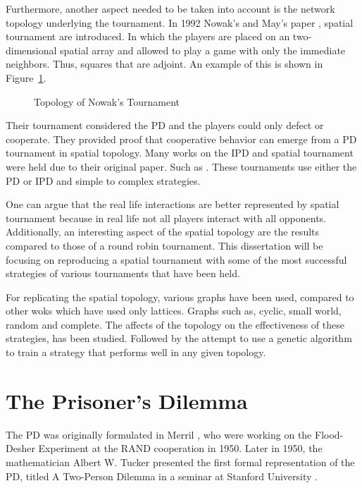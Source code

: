 Furthermore, another aspect needed to be taken into account is the network
topology underlying the tournament. In 1992 Nowak's and May's paper \cite{Nowak1992},
spatial tournament are introduced. In which the players are placed on an two-
dimensional spatial array and allowed to play a game with only the immediate neighbors.
Thus, squares that are adjoint. An example of this is shown in Figure~\ref{fig:nowak-example}.

\begin{figure}[!hbtp]
	\centering
		
		\caption{Topology of Nowak's Tournament}
  \label{fig:nowak-example}
\end{figure}

Their tournament considered the PD and the players could only defect or
cooperate.  They provided proof that cooperative behavior can emerge from a PD
tournament in spatial topology. Many works on the IPD and spatial tournament
were held due to their original paper. Such as \cite{Grujic2014, Nowak1993,
Maciver1992, Nowak1992, Brauchli1999, Meng2015, Lindgren1994}.
These tournaments use either the PD or IPD and simple to complex strategies.

One can argue that the real life interactions are better represented by spatial
tournament because in real life not all players interact with all opponents.
Additionally, an interesting aspect of the spatial topology are the results
compared to those of a round robin tournament. This dissertation will be focusing on
reproducing a spatial tournament with some of the most successful strategies of
various tournaments that have been held.

For replicating the spatial topology, various graphs have been used, compared to
other woks which have used only lattices. Graphs such as, cyclic,
small world, random and complete. The affects of the topology on the
effectiveness of these strategies, has been studied. Followed by the attempt to
use a genetic algorithm to train a strategy that performs well in any given
topology.

\section{The Prisoner's Dilemma}
The PD was originally formulated in Merril \cite{Flood1958},
who were working on the Flood-Desher Experiment at the RAND cooperation in 1950.
Later in 1950, the mathematician Albert W. Tucker presented the first formal
representation of the PD, titled  A Two-Person Dilemma in a seminar at
Stanford University \cite{GassAssad2005}.

